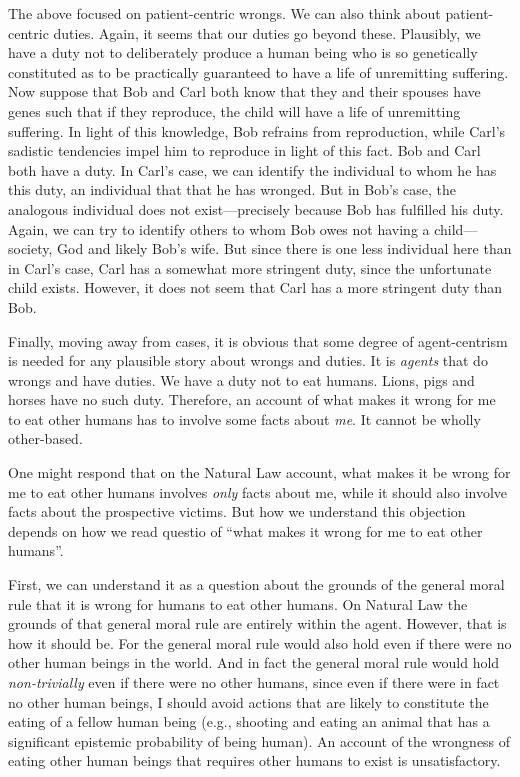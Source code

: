 The above focused on patient-centric wrongs. We can also think about patient-centric duties. Again, it seems that our duties go 
beyond these. Plausibly, we have a duty not to deliberately produce a human being who is so genetically constituted as to be 
practically guaranteed to have a life of unremitting suffering. Now suppose that Bob and Carl both know that they and their 
spouses have genes such that if they reproduce, the child will have a life of unremitting suffering. In light of this knowledge,
Bob refrains from reproduction, while Carl's sadistic tendencies impel him to reproduce in light of this fact. Bob and Carl both
have a duty. In Carl's case, we can identify the individual to whom he has this duty, an individual that that he has wronged.
But in Bob's case, the analogous individual does not exist---precisely because Bob has fulfilled his duty. Again, we can try to
identify others to whom Bob owes not having a child---society, God and likely Bob's wife. But since there is one less individual
here than in Carl's case, Carl has a somewhat more stringent duty, since the unfortunate child exists. However, it does not seem
that Carl has a more stringent duty than Bob.

Finally, moving away from cases, it is obvious that some degree of agent-centrism is needed for any plausible story about wrongs 
and duties. It is \textit{agents} that do wrongs and have duties. We have a duty not to eat humans. Lions, pigs and horses have no 
such  duty. Therefore, an account of what makes it wrong for me to eat other humans has to involve some facts about \textit{me}.
It cannot be wholly other-based. 

One might respond that on the Natural Law account, what makes it be wrong for me to eat other humans involves \textit{only} facts
about me, while it should also involve facts about the prospective victims. But how we understand this objection depends on how 
we read questio of ``what makes it wrong for me to eat other humans''. 

First, we can understand it as a question about the grounds of 
the general moral rule that it is wrong for humans to eat other humans. On Natural Law the grounds of that general moral rule 
are entirely within the agent. However, that is how it should be. For the general moral rule would also hold even if there were
no other human beings in the world. And in fact the general moral rule would hold \textit{non-trivially} even if there were no
other humans, since even if there were in fact no other human beings, I should avoid actions that are likely to constitute the eating
of a fellow human being (e.g., shooting and eating an animal that has a significant epistemic probability of being human). 
An account of the wrongness of eating other human beings that requires other humans to exist is unsatisfactory.

